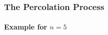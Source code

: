 \documentclass{beamer}
\begin{document}
	\begin{frame}
		\frametitle{The Percolation Process}
		\framesubtitle{Example for $n=5$}
		\begin{center}

\end{center}
\end{frame}
\end{document}

